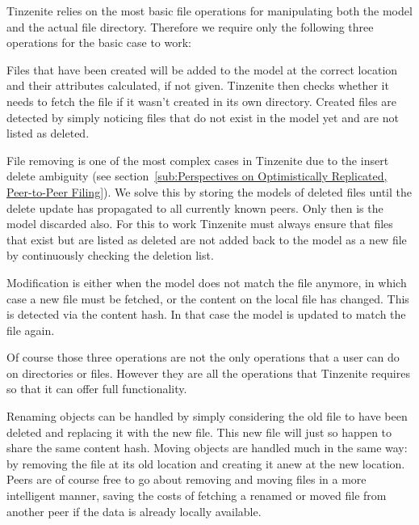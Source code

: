 Tinzenite relies on the most basic file operations for manipulating both the model and the actual file directory.
Therefore we require only the following three operations for the basic case to work:

\begin{description}[leftmargin=5em,style=nextline,noitemsep,nolistsep]
    \item[Create]
        Files that have been created will be added to the model at the correct location and their attributes calculated, if not given.
        Tinzenite then checks whether it needs to fetch the file if it wasn't created in its own directory.
        Created files are detected by simply noticing files that do not exist in the model yet and are not listed as deleted.
    \item[Remove]
        File removing is one of the most complex cases in Tinzenite due to the insert delete ambiguity (see section~\ref{sub:Perspectives on Optimistically Replicated, Peer-to-Peer Filing}).
        We solve this by storing the models of deleted files until the delete update has propagated to all currently known peers.
        Only then is the model discarded also.
        For this to work Tinzenite must always ensure that files that exist but are listed as deleted are not added back to the model as a new file by continuously checking the deletion list.
    \item[Modify]
        Modification is either when the model does not match the file anymore, in which case a new file must be fetched, or the content on the local file has changed.
        This is detected via the content hash.
        In that case the model is updated to match the file again.
\end{description}

Of course those three operations are not the only operations that a user can do on directories or files.
However they are all the operations that Tinzenite requires so that it can offer full functionality.

Renaming objects can be handled by simply considering the old file to have been deleted and replacing it with the new file.
This new file will just so happen to share the same content hash.
Moving objects are handled much in the same way: by removing the file at its old location and creating it anew at the new location.
Peers are of course free to go about removing and moving files in a more intelligent manner, saving the costs of fetching a renamed or moved file from another peer if the data is already locally available.

